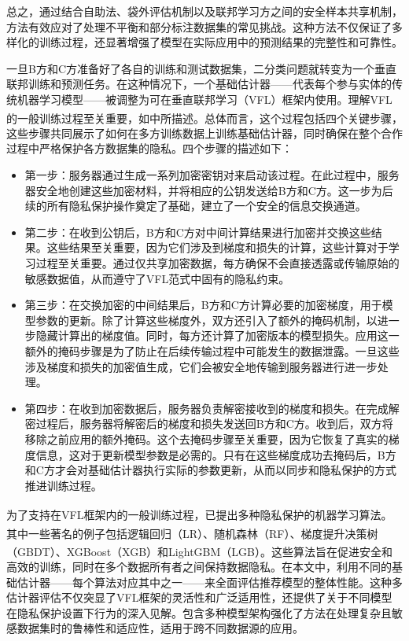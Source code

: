 总之，通过结合自助法、袋外评估机制以及联邦学习方之间的安全样本共享机制，方法有效应对了处理不平衡和部分标注数据集的常见挑战。这种方法不仅保证了多样化的训练过程，还显著增强了模型在实际应用中的预测结果的完整性和可靠性。

一旦B方和C方准备好了各自的训练和测试数据集，二分类问题就转变为一个垂直联邦训练和预测任务。在这种情况下，一个基础估计器——代表每个参与实体的传统机器学习模型——被调整为可在垂直联邦学习（VFL）框架内使用。理解VFL的一般训练过程至关重要，如\textsuperscript{\cite{yang2019federated}}中所描述。总体而言，这个过程包括四个关键步骤，这些步骤共同展示了如何在多方训练数据上训练基础估计器，同时确保在整个合作过程中严格保护各方数据集的隐私。四个步骤的描述如下：

\begin{itemize}
	\item 第一步：服务器通过生成一系列加密密钥对来启动该过程。在此过程中，服务器安全地创建这些加密材料，并将相应的公钥发送给B方和C方。这一步为后续的所有隐私保护操作奠定了基础，建立了一个安全的信息交换通道。
	
	\item 第二步：在收到公钥后，B方和C方对中间计算结果进行加密并交换这些结果。这些结果至关重要，因为它们涉及到梯度和损失的计算，这些计算对于学习过程至关重要。通过仅共享加密数据，每方确保不会直接透露或传输原始的敏感数据值，从而遵守了VFL范式中固有的隐私约束。
	
	\item 第三步：在交换加密的中间结果后，B方和C方计算必要的加密梯度，用于模型参数的更新。除了计算这些梯度外，双方还引入了额外的掩码机制，以进一步隐藏计算出的梯度值。同时，每方还计算了加密版本的模型损失。应用这一额外的掩码步骤是为了防止在后续传输过程中可能发生的数据泄露。一旦这些涉及梯度和损失的加密值生成，它们会被安全地传输到服务器进行进一步处理。
	
	\item 第四步：在收到加密数据后，服务器负责解密接收到的梯度和损失。在完成解密过程后，服务器将解密后的梯度和损失发送回B方和C方。收到后，双方将移除之前应用的额外掩码。这个去掩码步骤至关重要，因为它恢复了真实的梯度信息，这对于更新模型参数是必需的。只有在这些梯度成功去掩码后，B方和C方才会对基础估计器执行实际的参数更新，从而以同步和隐私保护的方式推进训练过程。
\end{itemize}

为了支持在VFL框架内的一般训练过程，已提出多种隐私保护的机器学习算法\textsuperscript{\cite{yang2019federated}}。其中一些著名的例子包括逻辑回归（LR）\textsuperscript{\cite{he2021secure,yang2019parallel}}、随机森林（RF）\textsuperscript{\cite{yao2022efficient}}、梯度提升决策树（GBDT）\textsuperscript{\cite{he2021secure}}、XGBoost（XGB）\textsuperscript{\cite{xu2021efficient,wang2022feverless}}和LightGBM（LGB）\textsuperscript{\cite{feng2019securegbm}}。这些算法旨在促进安全和高效的训练，同时在多个数据所有者之间保持数据隐私。在本文中，利用不同的基础估计器——每个算法对应其中之一——来全面评估推荐模型的整体性能。这种多估计器评估不仅突显了VFL框架的灵活性和广泛适用性，还提供了关于不同模型在隐私保护设置下行为的深入见解。包含多种模型架构强化了方法在处理复杂且敏感数据集时的鲁棒性和适应性，适用于跨不同数据源的应用。

